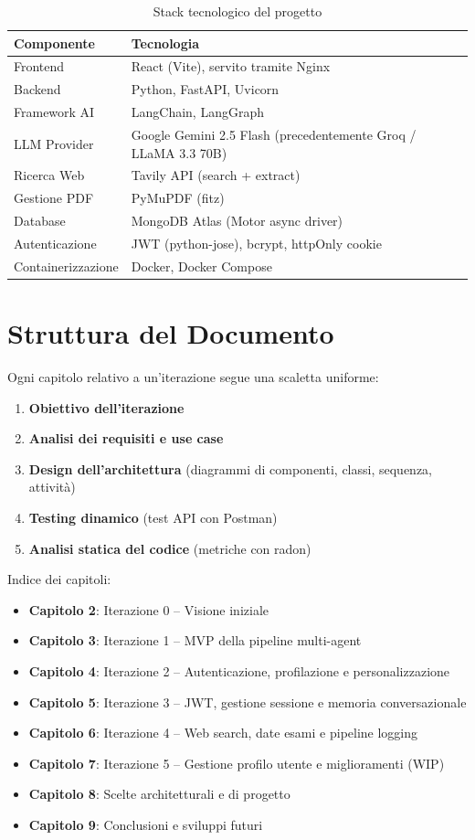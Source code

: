 \documentclass[a4paper,12pt]{report}
\begin{document}
\begin{table}[H]
\centering
\begin{tabularx}{\textwidth}{l X}
\toprule
\textbf{Componente} & \textbf{Tecnologia} \\
\midrule
Frontend & React (Vite), servito tramite Nginx \\
Backend & Python, FastAPI, Uvicorn \\
Framework AI & LangChain, LangGraph \\
LLM Provider & Google Gemini 2.5 Flash (precedentemente Groq / LLaMA 3.3 70B) \\
Ricerca Web & Tavily API (search + extract) \\
Gestione PDF & PyMuPDF (fitz) \\
Database & MongoDB Atlas (Motor async driver) \\
Autenticazione & JWT (python-jose), bcrypt, httpOnly cookie \\
Containerizzazione & Docker, Docker Compose \\
\bottomrule
\end{tabularx}
\caption{Stack tecnologico del progetto}
\end{table}

\section{Struttura del Documento}

Ogni capitolo relativo a un'iterazione segue una scaletta uniforme:
\begin{enumerate}
    \item \textbf{Obiettivo dell'iterazione}
    \item \textbf{Analisi dei requisiti e use case}
    \item \textbf{Design dell'architettura} (diagrammi di componenti, classi, sequenza, attività)
    \item \textbf{Testing dinamico} (test API con Postman)
    \item \textbf{Analisi statica del codice} (metriche con radon)
\end{enumerate}

Indice dei capitoli:
\begin{itemize}
    \item \textbf{Capitolo 2}: Iterazione 0 -- Visione iniziale
    \item \textbf{Capitolo 3}: Iterazione 1 -- MVP della pipeline multi-agent
    \item \textbf{Capitolo 4}: Iterazione 2 -- Autenticazione, profilazione e personalizzazione
    \item \textbf{Capitolo 5}: Iterazione 3 -- JWT, gestione sessione e memoria conversazionale
    \item \textbf{Capitolo 6}: Iterazione 4 -- Web search, date esami e pipeline logging
    \item \textbf{Capitolo 7}: Iterazione 5 -- Gestione profilo utente e miglioramenti (WIP)
    \item \textbf{Capitolo 8}: Scelte architetturali e di progetto
    \item \textbf{Capitolo 9}: Conclusioni e sviluppi futuri
\end{itemize}
\end{document}

